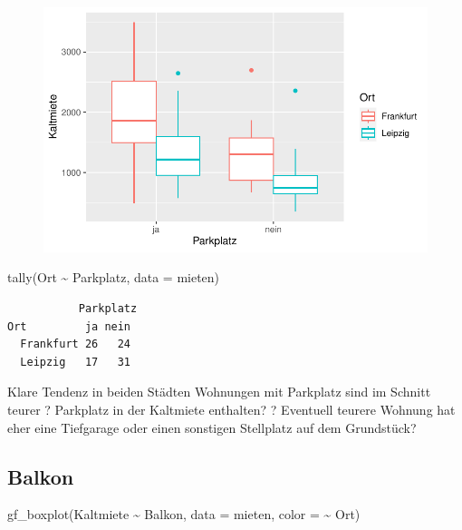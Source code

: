 \documentclass[
  a4paper,
  DIV=11]{scrartcl}
\newenvironment{Shaded}{\begin{snugshade}}{\end{snugshade}}
\newcommand{\AttributeTok}[1]{\textcolor[rgb]{0.40,0.45,0.13}{#1}}
\newcommand{\FunctionTok}[1]{\textcolor[rgb]{0.28,0.35,0.67}{#1}}
\newcommand{\NormalTok}[1]{\textcolor[rgb]{0.00,0.23,0.31}{#1}}
\newcommand{\SpecialCharTok}[1]{\textcolor[rgb]{0.37,0.37,0.37}{#1}}
\begin{document}
\begin{figure}[H]

{\centering \includegraphics{Mietmodellierung_files/figure-pdf/unnamed-chunk-12-1.pdf}

}

\end{figure}

\begin{Shaded}
\begin{Highlighting}[]
\FunctionTok{tally}\NormalTok{(Ort }\SpecialCharTok{\textasciitilde{}}\NormalTok{ Parkplatz, }\AttributeTok{data =}\NormalTok{ mieten)}
\end{Highlighting}
\end{Shaded}

\begin{verbatim}
           Parkplatz
Ort         ja nein
  Frankfurt 26   24
  Leipzig   17   31
\end{verbatim}

Klare Tendenz in beiden Städten Wohnungen mit Parkplatz sind im Schnitt
teurer ? Parkplatz in der Kaltmiete enthalten? ? Eventuell teurere
Wohnung hat eher eine Tiefgarage oder einen sonstigen Stellplatz auf dem
Grundstück?

\hypertarget{balkon}{%
\subsection{Balkon}\label{balkon}}

\begin{Shaded}
\begin{Highlighting}[]
\FunctionTok{gf\_boxplot}\NormalTok{(Kaltmiete }\SpecialCharTok{\textasciitilde{}}\NormalTok{ Balkon, }\AttributeTok{data =}\NormalTok{ mieten, }\AttributeTok{color =} \SpecialCharTok{\textasciitilde{}}\NormalTok{ Ort)}
\end{Highlighting}
\end{Shaded}
\end{document}
